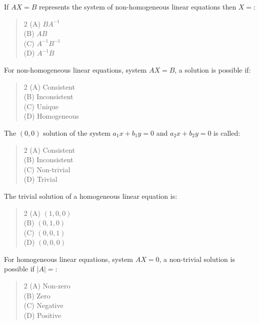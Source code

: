 \documentclass[11pt,a4paper]{article}
\begin{document}
\begin{mcqlist}
\item If $AX=B$ represents the system of non-homogeneous linear equations then $X=$:
\begin{quote}\begin{multicols}{2}
\noindent (A) $BA^{-1}$ \\
(B) $AB$ \\
(C) $A^{-1}B^{-1}$ \\
(D) $A^{-1}B$
\end{multicols}\end{quote}

\item For non-homogeneous linear equations, system $AX=B$, a solution is possible if:
\begin{quote}\begin{multicols}{2}
\noindent (A) Consistent \\
(B) Inconsistent \\
(C) Unique \\
(D) Homogeneous
\end{multicols}\end{quote}

\item The $(0,0)$ solution of the system $a_1x+b_1y=0$ and $a_2x+b_2y=0$ is called:
\begin{quote}\begin{multicols}{2}
\noindent (A) Consistent \\
(B) Inconsistent \\
(C) Non-trivial \\
(D) Trivial
\end{multicols}\end{quote}

\item The trivial solution of a homogeneous linear equation is:
\begin{quote}\begin{multicols}{2}
\noindent (A) $(1,0,0)$ \\
(B) $(0,1,0)$ \\
(C) $(0,0,1)$ \\
(D) $(0,0,0)$
\end{multicols}\end{quote}

\item For homogeneous linear equations, system $AX=0$, a non-trivial solution is possible if $|A|=$:
\begin{quote}\begin{multicols}{2}
\noindent (A) Non-zero \\
(B) Zero \\
(C) Negative \\
(D) Positive
\end{multicols}\end{quote}


\end{mcqlist}
\end{document}
